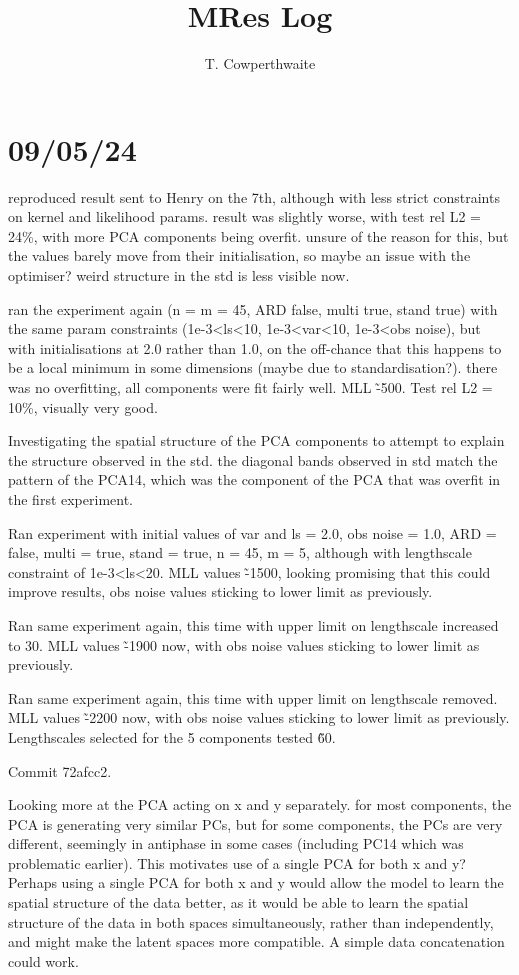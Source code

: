\documentclass[11pt,a4paper]{article}
\begin{document}
\title{MRes Log}
\author{T. Cowperthwaite}

\maketitle

\section{09/05/24}

reproduced result sent to Henry on the 7th, although with less strict constraints on kernel and likelihood params. 
result was slightly worse, with test rel L2 = 24\%, with more PCA components being overfit.
unsure of the reason for this, but the values barely move from their initialisation, so maybe an issue with the optimiser?
weird structure in the std is less visible now.

ran the experiment again (n = m = 45, ARD false, multi true, stand true) with the same param constraints (1e-3<ls<10, 1e-3<var<10, 1e-3<obs noise), but with initialisations at 2.0 rather than 1.0, on the off-chance that this happens to be a local minimum in some dimensions (maybe due to standardisation?).
there was no overfitting, all components were fit fairly well. 
MLL \~-500.
Test rel L2 = 10\%, visually very good.

Investigating the spatial structure of the PCA components to attempt to explain the structure observed in the std.
the diagonal bands observed in std match the pattern of the PCA14, which was the component of the PCA that was overfit in the first experiment.

Ran experiment with initial values of var and ls = 2.0, obs noise = 1.0, ARD = false, multi = true, stand = true, n = 45, m = 5, although with lengthscale constraint of 1e-3<ls<20.
MLL values \~-1500, looking promising that this could improve results, obs noise values sticking to lower limit as previously.

Ran same experiment again, this time with upper limit on lengthscale increased to 30.
MLL values \~-1900 now, with obs noise values sticking to lower limit as previously.

Ran same experiment again, this time with upper limit on lengthscale removed.
MLL values \~-2200 now, with obs noise values sticking to lower limit as previously.
Lengthscales selected for the 5 components tested \~60.

Commit 72afcc2.

Looking more at the PCA acting on x and y separately.
for most components, the PCA is generating very similar PCs, but for some components, the PCs are very different, seemingly in antiphase in some cases (including PC14 which was problematic earlier).
This motivates use of a single PCA for both x and y? 
Perhaps using a single PCA for both x and y would allow the model to learn the spatial structure of the data better, as it would be able to learn the spatial structure of the data in both spaces simultaneously, rather than independently, and might make the latent spaces more compatible.
A simple data concatenation could work.
\end{document}
